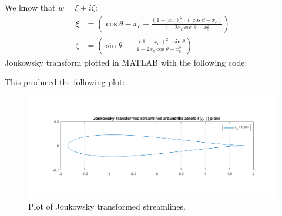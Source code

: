 \documentclass[11pt]{article}
\begin{document}
We know that $w = \xi + i\zeta$:
\begin{align}
  \xi &= \left(\cos\theta - x_c + \frac{\left(1-\left|x_c\right|\right)^2 \cdot \left(\cos\theta - x_c\right)}{1 -2x_c\cos\theta + x_c^2}\right)\\
  \zeta &= \left(\sin\theta + \frac{-\left(1-\left|x_c\right|\right)^2 \cdot \sin\theta}{1 -2x_c\cos\theta + x_c^2}\right)
\end{align}
Joukowsky transform plotted in MATLAB with the following code:

This produced the following plot:
\begin{figure}[H]
  \centering
  \includegraphics[width = \textwidth]{./img/diagram17.png}
  \caption{Plot of Joukowsky transformed streamlines.}
\end{figure} 
\end{document}
